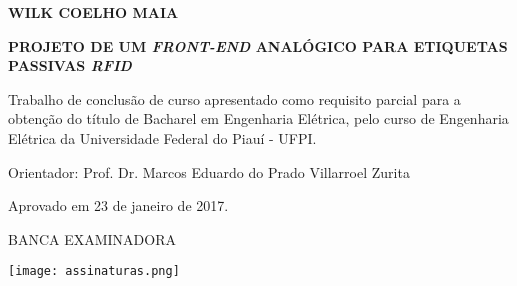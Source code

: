 \begin{center}
\textbf{\Large WILK COELHO MAIA}
\par
\vspace{2cm}
\textbf{\Large PROJETO DE UM \textit{FRONT-END} ANALÓGICO PARA ETIQUETAS PASSIVAS \textit{RFID}}
\end{center}
\par
\vspace{1cm}
\hspace*{160pt}\parbox{9cm}{{Trabalho de conclusão de curso apresentado como requisito parcial para a obtenção do título de Bacharel em Engenharia Elétrica, pelo curso de Engenharia Elétrica da Universidade Federal do Piauí - UFPI.}}
\vspace{1.75cm}
\par\hspace*{160pt}\parbox{10cm}{Orientador: Prof. Dr. Marcos Eduardo do Prado Villarroel Zurita}
\vspace{1cm}
\begin{center}
Aprovado em 23 de janeiro de 2017.
\vspace{1.5cm}

BANCA EXAMINADORA
\vspace{0.5cm}

\begin{figure*}[!htb]
	\begin{center}
		\texttt{[image: assinaturas.png]}
	\end{center}
\end{figure*}




\end{center}
\clearpage

